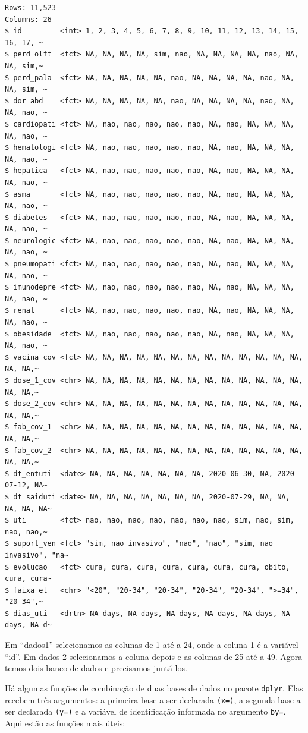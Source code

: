\documentclass[
  letterpaper,
  DIV=11,
  numbers=noendperiod]{scrreprt}
\begin{document}
\begin{verbatim}
Rows: 11,523
Columns: 26
$ id         <int> 1, 2, 3, 4, 5, 6, 7, 8, 9, 10, 11, 12, 13, 14, 15, 16, 17, ~
$ perd_olft  <fct> NA, NA, NA, NA, sim, nao, NA, NA, NA, NA, nao, NA, NA, sim,~
$ perd_pala  <fct> NA, NA, NA, NA, NA, nao, NA, NA, NA, NA, nao, NA, NA, sim, ~
$ dor_abd    <fct> NA, NA, NA, NA, NA, nao, NA, NA, NA, NA, nao, NA, NA, nao, ~
$ cardiopati <fct> NA, nao, nao, nao, nao, nao, NA, nao, NA, NA, NA, NA, nao, ~
$ hematologi <fct> NA, nao, nao, nao, nao, nao, NA, nao, NA, NA, NA, NA, nao, ~
$ hepatica   <fct> NA, nao, nao, nao, nao, nao, NA, nao, NA, NA, NA, NA, nao, ~
$ asma       <fct> NA, nao, nao, nao, nao, nao, NA, nao, NA, NA, NA, NA, nao, ~
$ diabetes   <fct> NA, nao, nao, nao, nao, nao, NA, nao, NA, NA, NA, NA, nao, ~
$ neurologic <fct> NA, nao, nao, nao, nao, nao, NA, nao, NA, NA, NA, NA, nao, ~
$ pneumopati <fct> NA, nao, nao, nao, nao, nao, NA, nao, NA, NA, NA, NA, nao, ~
$ imunodepre <fct> NA, nao, nao, nao, nao, nao, NA, nao, NA, NA, NA, NA, nao, ~
$ renal      <fct> NA, nao, nao, nao, nao, nao, NA, nao, NA, NA, NA, NA, nao, ~
$ obesidade  <fct> NA, nao, nao, nao, nao, nao, NA, nao, NA, NA, NA, NA, nao, ~
$ vacina_cov <fct> NA, NA, NA, NA, NA, NA, NA, NA, NA, NA, NA, NA, NA, NA, NA,~
$ dose_1_cov <chr> NA, NA, NA, NA, NA, NA, NA, NA, NA, NA, NA, NA, NA, NA, NA,~
$ dose_2_cov <chr> NA, NA, NA, NA, NA, NA, NA, NA, NA, NA, NA, NA, NA, NA, NA,~
$ fab_cov_1  <chr> NA, NA, NA, NA, NA, NA, NA, NA, NA, NA, NA, NA, NA, NA, NA,~
$ fab_cov_2  <chr> NA, NA, NA, NA, NA, NA, NA, NA, NA, NA, NA, NA, NA, NA, NA,~
$ dt_entuti  <date> NA, NA, NA, NA, NA, NA, NA, 2020-06-30, NA, 2020-07-12, NA~
$ dt_saiduti <date> NA, NA, NA, NA, NA, NA, NA, 2020-07-29, NA, NA, NA, NA, NA~
$ uti        <fct> nao, nao, nao, nao, nao, nao, nao, sim, nao, sim, nao, nao,~
$ suport_ven <fct> "sim, nao invasivo", "nao", "nao", "sim, nao invasivo", "na~
$ evolucao   <fct> cura, cura, cura, cura, cura, cura, cura, obito, cura, cura~
$ faixa_et   <chr> "<20", "20-34", "20-34", "20-34", "20-34", ">=34", "20-34",~
$ dias_uti   <drtn> NA days, NA days, NA days, NA days, NA days, NA days, NA d~
\end{verbatim}

Em ``dados1'' selecionamos as colunas de 1 até a 24, onde a coluna 1 é a
variável ``id''. Em dados 2 selecionamos a coluna depois e as colunas de
25 até a 49. Agora temos dois banco de dados e precisamos juntá-los.

Há algumas funções de combinação de duas bases de dados no pacote
\texttt{dplyr}. Elas recebem três argumentos: a primeira base a ser
declarada \texttt{(x=)}, a segunda base a ser declarada \texttt{(y=)} e
a variável de identificação informada no argumento \texttt{by=}. Aqui
estão as funções mais úteis:
\end{document}
